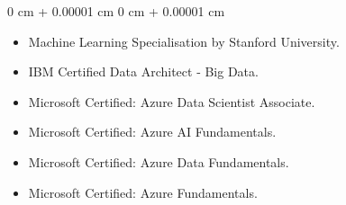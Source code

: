 \documentclass[10pt, letterpaper]{article}
\newenvironment{highlights}{
    \begin{itemize}[
        topsep=0.10 cm,
        parsep=0.10 cm,
        partopsep=0pt,
        itemsep=0pt,
        leftmargin=0 cm + 10pt
    ]
}{
    \end{itemize}
} %
\newenvironment{onecolentry}{
    \begin{adjustwidth}{
        0 cm + 0.00001 cm
    }{
        0 cm + 0.00001 cm
    }
}{
    \end{adjustwidth}
} %
\begin{document}
        \begin{onecolentry}
            \begin{highlights}
                \item Machine Learning Specialisation by Stanford University.
                \item IBM Certified Data Architect - Big Data.
                                \item 
Microsoft Certified: Azure Data Scientist Associate. 

                \item 

Microsoft Certified: Azure AI Fundamentals. 

                \item 


Microsoft Certified: Azure Data Fundamentals. 


                \item 


Microsoft Certified: Azure Fundamentals. 


            \end{highlights}
        \end{onecolentry}





    
\end{document}
